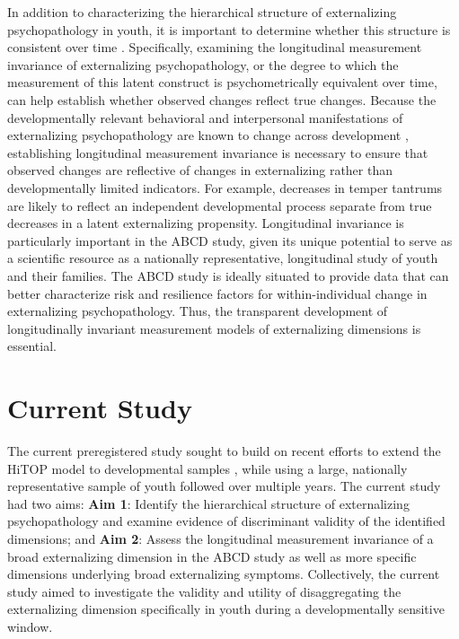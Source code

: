 \documentclass[
  20pt,
  number,
  preprint,
  3p,
  twocolumn]{elsarticle}
\begin{document}
In addition to characterizing the hierarchical structure of
externalizing psychopathology in youth, it is important to determine
whether this structure is consistent over time \citep{vandenberg2000}.
Specifically, examining the longitudinal measurement invariance of
externalizing psychopathology, or the degree to which the measurement of
this latent construct is psychometrically equivalent over time, can help
establish whether observed changes reflect true changes. Because the
developmentally relevant behavioral and interpersonal manifestations of
externalizing psychopathology are known to change across development
\citep{petersen2020}, establishing longitudinal measurement invariance
is necessary to ensure that observed changes are reflective of changes
in externalizing rather than developmentally limited indicators. For
example, decreases in temper tantrums are likely to reflect an
independent developmental process separate from true decreases in a
latent externalizing propensity. Longitudinal invariance is particularly
important in the ABCD study, given its unique potential to serve as a
scientific resource as a nationally representative, longitudinal study
of youth and their families. The ABCD study is ideally situated to
provide data that can better characterize risk and resilience factors
for within-individual change in externalizing psychopathology. Thus, the
transparent development of longitudinally invariant measurement models
of externalizing dimensions is essential.

\hypertarget{current-study}{%
\section{Current Study}\label{current-study}}

The current preregistered study sought to build on recent efforts to
extend the HiTOP model to developmental samples
\citep[e.g.,][]{forbes2023}, while using a large, nationally
representative sample of youth followed over multiple years. The current
study had two aims: \textbf{Aim 1}: Identify the hierarchical structure
of externalizing psychopathology and examine evidence of discriminant
validity of the identified dimensions; and \textbf{Aim 2}: Assess the
longitudinal measurement invariance of a broad externalizing dimension
in the ABCD study as well as more specific dimensions underlying broad
externalizing symptoms. Collectively, the current study aimed to
investigate the validity and utility of disaggregating the externalizing
dimension specifically in youth during a developmentally sensitive
window.
\end{document}

